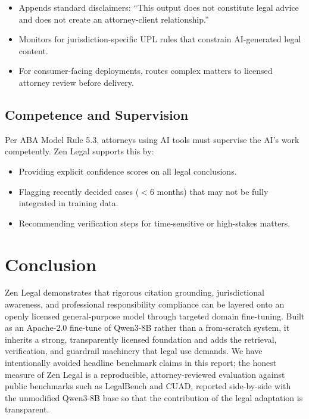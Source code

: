 \documentclass[11pt,a4paper]{article}
\begin{document}
\begin{itemize}
  \item Appends standard disclaimers: ``This output does not constitute legal advice and does not create an attorney-client relationship.''
  \item Monitors for jurisdiction-specific UPL rules that constrain AI-generated legal content.
  \item For consumer-facing deployments, routes complex matters to licensed attorney review before delivery.
\end{itemize}

\subsection{Competence and Supervision}

Per ABA Model Rule 5.3, attorneys using AI tools must supervise the AI's work competently. Zen Legal supports this by:

\begin{itemize}
  \item Providing explicit confidence scores on all legal conclusions.
  \item Flagging recently decided cases ($<$6 months) that may not be fully integrated in training data.
  \item Recommending verification steps for time-sensitive or high-stakes matters.
\end{itemize}

\section{Conclusion}

Zen Legal demonstrates that rigorous citation grounding, jurisdictional awareness, and professional responsibility compliance can be layered onto an openly licensed general-purpose model through targeted domain fine-tuning. Built as an Apache-2.0 fine-tune of Qwen3-8B rather than a from-scratch system, it inherits a strong, transparently licensed foundation and adds the retrieval, verification, and guardrail machinery that legal use demands. We have intentionally avoided headline benchmark claims in this report; the honest measure of Zen Legal is a reproducible, attorney-reviewed evaluation against public benchmarks such as LegalBench and CUAD, reported side-by-side with the unmodified Qwen3-8B base so that the contribution of the legal adaptation is transparent.
\end{document}
